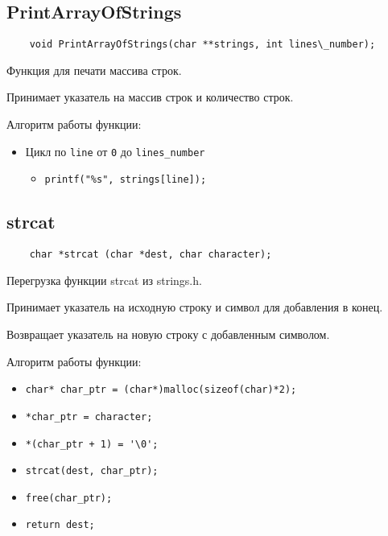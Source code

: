 \subsection*{PrintArrayOfStrings}

\begin{lstlisting}
	void PrintArrayOfStrings(char **strings, int lines\_number);
\end{lstlisting}

Функция для печати массива строк.

Принимает указатель на массив строк и количество строк.

Алгоритм работы функции:

\begin{itemize}
	\item Цикл по \verb|line| от \verb|0| до \verb|lines_number|
	\begin{itemize}
		\item \verb|printf("%s", strings[line]);|
	\end{itemize}
\end{itemize}

\subsection*{strcat}

\begin{lstlisting}
	char *strcat (char *dest, char character);
\end{lstlisting}

Перегрузка функции strcat из strings.h.

Принимает указатель на исходную строку и символ для добавления в конец.

Возвращает указатель на новую строку с добавленным символом.

Алгоритм работы функции:

\begin{itemize}
	\item \verb|char* char_ptr = (char*)malloc(sizeof(char)*2);|
    \item \verb|*char_ptr = character;|
    \item \verb|*(char_ptr + 1) = '\0';|
    \item \verb|strcat(dest, char_ptr);|
    \item \verb|free(char_ptr);|
    \item \verb|return dest;|
\end{itemize}

